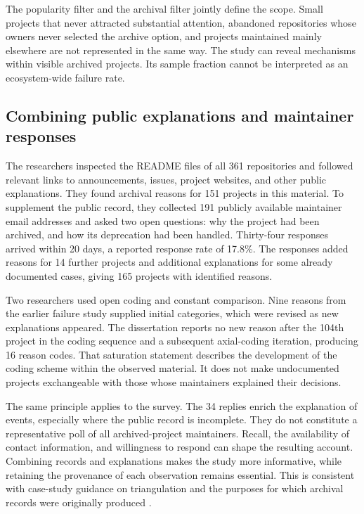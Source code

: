 The popularity filter and the archival filter jointly define the scope. Small projects that never attracted substantial attention, abandoned repositories whose owners never selected the archive option, and projects maintained mainly elsewhere are not represented in the same way. The study can reveal mechanisms within visible archived projects. Its sample fraction cannot be interpreted as an ecosystem-wide failure rate.



\subsection{Combining public explanations and maintainer responses}
The researchers inspected the README files of all 361 repositories and followed relevant links to announcements, issues, project websites, and other public explanations. They found archival reasons for 151 projects in this material. To supplement the public record, they collected 191 publicly available maintainer email addresses and asked two open questions: why the project had been archived, and how its deprecation had been handled. Thirty-four responses arrived within 20 days, a reported response rate of 17.8\%. The responses added reasons for 14 further projects and additional explanations for some already documented cases, giving 165 projects with identified reasons.

Two researchers used open coding and constant comparison. Nine reasons from the earlier failure study supplied initial categories, which were revised as new explanations appeared. The dissertation reports no new reason after the 104th project in the coding sequence and a subsequent axial-coding iteration, producing 16 reason codes. That saturation statement describes the development of the coding scheme within the observed material. It does not make undocumented projects exchangeable with those whose maintainers explained their decisions.

The same principle applies to the survey. The 34 replies enrich the explanation of events, especially where the public record is incomplete. They do not constitute a representative poll of all archived-project maintainers. Recall, the availability of contact information, and willingness to respond can shape the resulting account. Combining records and explanations makes the study more informative, while retaining the provenance of each observation remains essential. This is consistent with case-study guidance on triangulation and the purposes for which archival records were originally produced \citep{runeson2009}.

